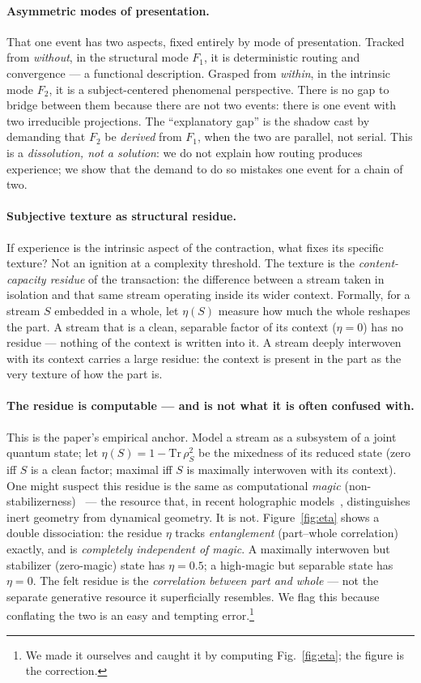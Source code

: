 \documentclass[11pt]{article}
\begin{document}
\paragraph{Asymmetric modes of presentation.} That one event has two aspects, fixed entirely by mode of
presentation. Tracked from \emph{without}, in the structural mode $F_1$, it is deterministic routing
and convergence --- a functional description. Grasped from \emph{within}, in the intrinsic mode $F_2$,
it is a subject-centered phenomenal perspective. There is no gap to bridge between them because there
are not two events: there is one event with two irreducible projections. The ``explanatory gap'' is the
shadow cast by demanding that $F_2$ be \emph{derived} from $F_1$, when the two are parallel, not serial.
This is a \emph{dissolution, not a solution}: we do not explain how routing produces experience; we show
that the demand to do so mistakes one event for a chain of two.

\paragraph{Subjective texture as structural residue.} If experience is the intrinsic aspect of the
contraction, what fixes its specific texture? Not an ignition at a complexity threshold. The texture is
the \emph{content-capacity residue} of the transaction: the difference between a stream taken in
isolation and that same stream operating inside its wider context. Formally, for a stream $S$ embedded
in a whole, let $\eta(S)$ measure how much the whole reshapes the part. A stream that is a clean,
separable factor of its context ($\eta = 0$) has no residue --- nothing of the context is written into
it. A stream deeply interwoven with its context carries a large residue: the context is present in the
part as the very texture of how the part is.

\paragraph{The residue is computable --- and is not what it is often confused with.} This is the
paper's empirical anchor. Model a stream as a subsystem of a joint quantum state; let $\eta(S) = 1 -
\mathrm{Tr}\,\rho_S^2$ be the mixedness of its reduced state (zero iff $S$ is a clean factor; maximal
iff $S$ is maximally interwoven with its context). One might suspect this residue is the same as
computational \emph{magic} (non-stabilizerness)~\cite{bravyi2005,leone2022} --- the resource that, in
recent holographic models~\cite{ryu2006,vanraamsdonk2010,quanta2026}, distinguishes inert geometry from
dynamical geometry. It is not. Figure~\ref{fig:eta} shows a double
dissociation: the residue $\eta$ tracks \emph{entanglement} (part--whole correlation) exactly, and is
\emph{completely independent of magic}. A maximally interwoven but stabilizer (zero-magic) state has
$\eta = 0.5$; a high-magic but separable state has $\eta = 0$. The felt residue is the
\emph{correlation between part and whole} --- not the separate generative resource it superficially
resembles. We flag this because conflating the two is an easy and tempting error.\footnote{We made it
ourselves and caught it by computing Fig.~\ref{fig:eta}; the figure is the correction.}
\end{document}
